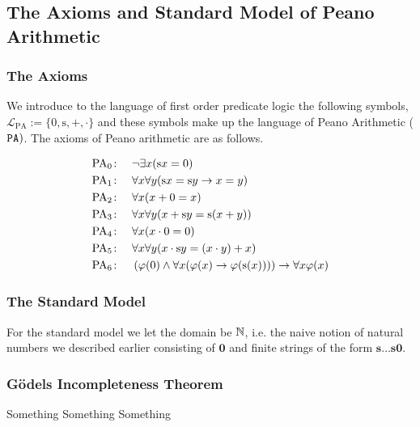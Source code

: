\subsection{The Axioms and Standard Model of Peano Arithmetic}

\subsubsection{The Axioms}
We introduce to the language of first order predicate logic the following symbols, $\mathcal{L}_{\mathrm{PA}}:=\{0,\mathrm{s},+,\cdot\}$ and these symbols make up the language of Peano Arithmetic ($\verb|PA|)$. The axioms of Peano arithmetic are as follows. 
    \begin{axioms}
        \begin{align*}
            \mathrm{PA}_0\colon\quad & \neg \exists x (\mathrm{s} x = 0) \\
            \mathrm{PA}_1\colon\quad & \forall x \forall y (\mathrm{s} x = \mathrm{s} y \rightarrow x = y) \\
            \mathrm{PA}_2\colon\quad & \forall x (x + 0 = x) \\
            \mathrm{PA}_3\colon\quad & \forall x \forall y (x + \mathrm{s} y = \mathrm{s}(x + y)) \\
            \mathrm{PA}_4\colon\quad & \forall x (x \cdot 0 = 0) \\
            \mathrm{PA}_5\colon\quad & \forall x \forall y (x \cdot \mathrm{s} y = (x \cdot y) + x) \\
            \mathrm{PA}_6\colon\quad & \left( \varphi(0) \land \forall x (\varphi(x) \rightarrow \varphi(\mathrm{s} (x))) \right) \rightarrow \forall x \varphi(x)
        \end{align*}
    \end{axioms}
\subsubsection{The Standard Model}
For the standard model we let the domain be $\mathbb{N}$, i.e. the naive notion of natural numbers we described earlier consisting of $\mathbf{0}$ and finite strings of the form $\mathbf{s}\dots \mathbf{s}\mathbf{0}$. 


\subsubsection{Gödels Incompleteness Theorem}
Something Something Something 
